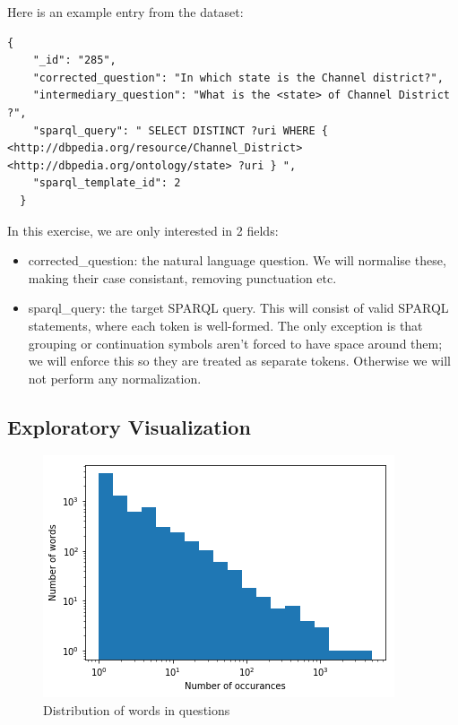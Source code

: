 \documentclass[12pt]{article}
\begin{document}
Here is an example entry from the dataset:

\begin{lstlisting}[]
  {
    "_id": "285", 
    "corrected_question": "In which state is the Channel district?", 
    "intermediary_question": "What is the <state> of Channel District ?", 
    "sparql_query": " SELECT DISTINCT ?uri WHERE { <http://dbpedia.org/resource/Channel_District> <http://dbpedia.org/ontology/state> ?uri } ", 
    "sparql_template_id": 2
  }
\end{lstlisting}

In this exercise, we are only interested in 2 fields:

\begin{itemize}
  \item 
    corrected\_question: the natural language question. We will normalise these, 
    making their case consistant, removing punctuation etc.
  \item
    sparql\_query: the target SPARQL query. This will consist of valid SPARQL statements,
    where each token is well-formed. The only exception is that grouping or continuation 
    symbols aren't forced to have space around them; we will enforce this so they are treated
    as separate tokens. Otherwise we will not perform any normalization.
\end{itemize}

\subsection{Exploratory Visualization}\label{exploratory-visualization}

\begin{figure}
  \centering
  \includegraphics{images/question_word_distribution.png}
  \caption{Distribution of words in questions}
  \label{fig:question_word_distribution}
\end{figure}
\end{document}
